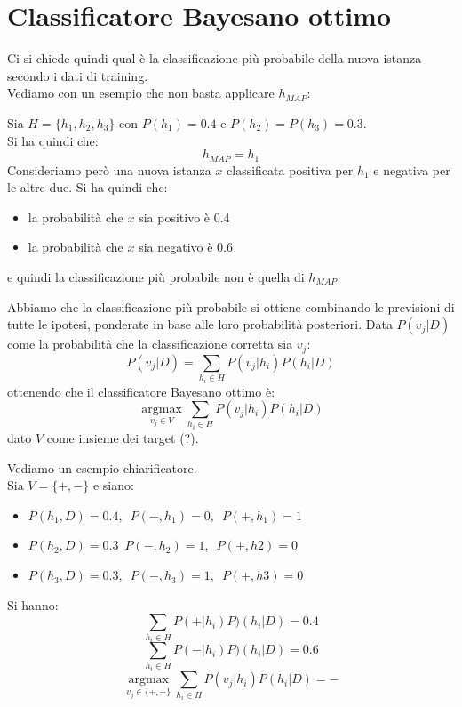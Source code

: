 \documentclass[a4paper,12pt, oneside]{book}
\begin{document}
\section{Classificatore Bayesano ottimo}
Ci si chiede quindi qual è la classificazione più probabile della nuova istanza
secondo i dati di training.\\
Vediamo con un esempio che non basta applicare $h_{MAP}$:
\begin{esempio}
  Sia $H=\{h_1,h_2,h_3\}$ con $P(h_1)=0.4$ e $P(h_2)=P(h_3)=0.3$.\\
  Si ha quindi che:
  \[h_{MAP}=h_1\]
  Consideriamo però una nuova istanza $x$ classificata positiva per $h_1$ e
  negativa per le altre due. Si ha quindi che:
  \begin{itemize}
    \item la probabilità che $x$ sia positivo è 0.4
    \item la probabilità che $x$ sia negativo è 0.6
  \end{itemize}
  e quindi la classificazione più probabile non è quella di $h_{MAP}$.
\end{esempio}
Abbiamo che la classificazione più probabile si ottiene combinando le previsioni
di tutte le ipotesi, ponderate in base alle loro probabilità posteriori. Data
$P(v_j|D)$ come la probabilità che la classificazione corretta sia $v_j$:
\[P(v_j|D)=\sum_{h_i\in H}P(v_j|h_i)P(h_i|D)\]
ottenendo che il classificatore Bayesano ottimo è:
\[\operatorname*{argmax}_{v_j\in V}\sum_{h_i\in H}P(v_j|h_i)P(h_i|D)\]
dato $V$ come insieme dei target (?).
\begin{esempio}
  Vediamo un esempio chiarificatore.\\
  Sia $V=\{+,-\}$ e siano:
  \begin{itemize}
    \item $P(h_1, D) =0.4,\,\,\,P(-, h_1) = 0,\,\,\,P(+, h_1) = 1$
    \item $P(h_2, D) =0.3\,\,\,P(-, h_2) = 1,\,\,\,P(+, h2) = 0$
    \item $P(h_3, D) =0.3,\,\,\,P(-, h_3) = 1,\,\,\,P(+, h3) = 0$
  \end{itemize}
  Si hanno:
  \[\sum_{h_i\in H}P(+|h_i)P)(h_i|D)=0.4\]
  \[\sum_{h_i\in H}P(-|h_i)P)(h_i|D)=0.6\]
  \[\operatorname*{argmax}_{v_j\in \{+,-\}}\sum_{h_i\in H}P(v_j|h_i)P(h_i|D)=-\]
\end{esempio}
\end{document}
